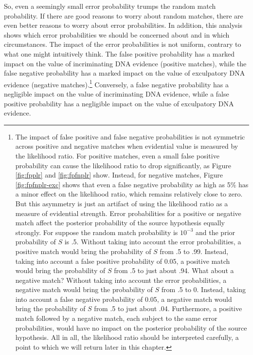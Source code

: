 \documentclass[
  10pt,
  dvipsnames,enabledeprecatedfontcommands]{scrartcl}
\begin{document}
So, even a seemingly small error probability trumps the random match
probability. If there are good reasons to worry about random matches,
there are even better reasons to worry about error probabilities. In
addition, this analysis shows which error probabilities we should be
concerned about and in which circumstances. The impact of the error
probabilities is not uniform, contrary to what one might intuitively
think. The false positive probability has a marked impact on the value
of incriminating DNA evidence (positive matches), while the false
negative probability has a marked impact on the value of exculpatory DNA
evidence (negative matches).\footnote{The impact of false positive and
  false negative probabilities is not symmetric across positive and
  negative matches when evidential value is measured by the likelihood
  ratio. For positive matches, even a small false positive probability
  can cause the likelihood ratio to drop significantly, as Figure
  \ref{fig:fpplr} and \ref{fig:fpfnplr} show. Instead, for negative
  matches, Figure \ref{fig:fpfnplr-exc} shows that even a false negative
  probability as high as 5\% has a minor effect on the likelihood ratio,
  which remains relatively close to zero. But this asymmetry is just an
  artifact of using the likelihood ratio as a measure of evidential
  strength. Error probabilities for a positive or negative match affect
  the posterior probability of the source hypothesis equally strongly.
  For suppose the random match probability is \(10^{-3}\) and the prior
  probability of \(S\) is .5. Without taking into account the error
  probabilities, a positive match would bring the probability of \(S\)
  from .5 to .99. Instead, taking into account a false positive
  probability of 0.05, a positive match would bring the probability of
  \(S\) from .5 to just about .94. What about a negative match? Without
  taking into account the error probabilities, a negative match would
  bring the probability of \(S\) from .5 to 0. Instead, taking into
  account a false negative probability of 0.05, a negative match would
  bring the probability of \(S\) from .5 to just about .04. Furthermore,
  a positive match followed by a negative match, each subject to the
  same error probabilities, would have no impact on the posterior
  probability of the source hypothesis. All in all, the likelihood ratio
  should be interpreted carefully, a point to which we will return later
  in this chapter.} Conversely, a false negative probability has a
negligible impact on the value of incriminating DNA evidence, while a
false positive probability has a negligible impact on the value of
exculpatory DNA evidence.
\end{document}
